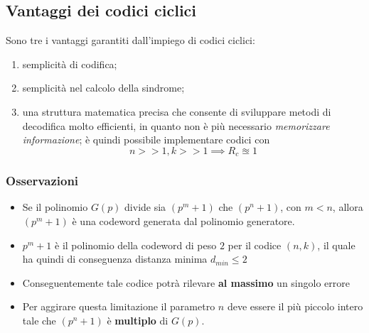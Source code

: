 \subsection{Vantaggi dei codici ciclici}
Sono tre i vantaggi garantiti dall'impiego di codici ciclici:
\begin{enumerate}
    \item semplicità di codifica;
    \item semplicità nel calcolo della sindrome;
    \item una struttura matematica precisa che consente di sviluppare metodi di decodifica molto efficienti, in quanto non è più necessario \textit{memorizzare informazione}; è quindi possibile implementare codici con
    $$n>>1,k>>1 \implies R_c \approxeq 1$$
\end{enumerate}
\subsubsection{Osservazioni}
\begin{itemize}
    \item Se il polinomio $G(p)$ divide sia $(p^m+1)$ che  $(p^n+1)$, con $m<n$, allora $(p^m+1)$ è una codeword generata dal polinomio generatore.
    \item $p^m+1$ è il polinomio della codeword di peso $2$ per il codice $(n,k)$, il quale ha quindi di conseguenza distanza minima $d_{min}\leq2$
    \item Conseguentemente tale codice potrà rilevare \textbf{al massimo} un singolo errore
    \item Per aggirare questa limitazione il parametro $n$ deve essere il più piccolo intero tale che $(p^n +1)$ è \textbf{multiplo} di $G(p)$.
\end{itemize}